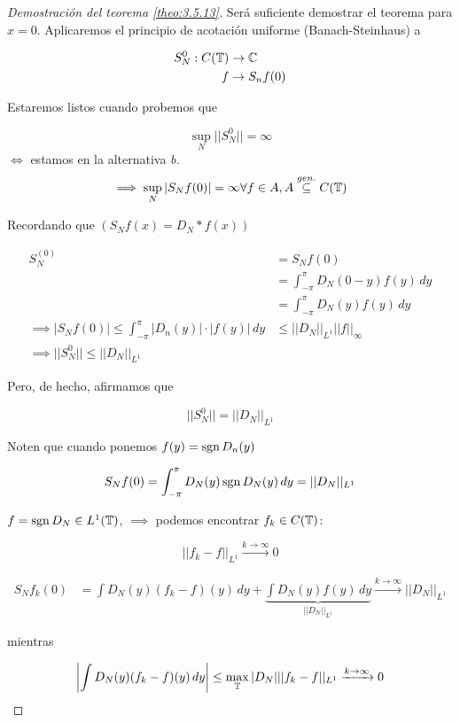 \begin{proof}[Demostración del teorema \ref{theo:3.5.13}]
    Será suficiente demostrar el teorema para $x=0$. Aplicaremos el principio de acotación uniforme (Banach-Steinhaus) a 

    \begin{align*}
        S_N^0:C(\mathbb{T})&\to\mathbb{C}\\
        f&\to S_n f(0)
    \end{align*}

    Estaremos listos cuando probemos que 

    \[\sup_N ||S_N^0||=\infty\]
    $\iff$ estamos en la alternativa \emph{b.}
    \[\implies \sup_N |S_N f(0)|=\infty\forall f\in A, A\overset{gen.}{\subseteq} C(\mathbb{T})\]

    Recordando que $(S_N f(x)=D_N*f(x))$

    \begin{align*}
        S_N^{(0)}&=S_N f(0)\\
        &=\int_{-\pi}^\pi D_N(0-y)f(y)\,dy\\
        &=\int_{-\pi}^\pi D_N(y)f(y)\,dy\\
        \implies |S_N f(0)|\leq \int_{-\pi}^\pi |D_n(y)|\cdot|f(y)|\,dy&\leq ||D_N||_{L^1}||f||_{\infty}\\
        \implies ||S_N^0||\leq ||D_N||_{L^1}
    \end{align*}

    Pero, de hecho, afirmamos que 

    \[||S_N^0||=||D_N||_{L^1}\]

    Noten que cuando ponemos $f(y)=\operatorname{sgn} D_n(y)$

    \[S_N f(0)=\int_{-\pi}^\pi D_N(y)\operatorname{sgn} D_N(y)\,dy=||D_N||_{L^1}\]

    $f=\operatorname{sgn} D_N\in L^1(\mathbb{T})$, $\implies$ podemos encontrar $f_k\in C(\mathbb{T})$:

    \[||f_k-f||_{L^1}\xrightarrow{k\to\infty}0\]

    \begin{align*}
        S_N f_k(0)&=\int D_N(y)(f_k-f)(y)\,dy+\underbrace{\int D_N(y)f(y)\,dy}_{||D_N||_{L^1}}\xrightarrow{k\to\infty} ||D_N||_{L^1}
    \end{align*}

    mientras 

    \[\left|\int D_N(y)(f_k-f)(y)\,dy\right|\leq \max_{\mathbb{T}} |D_N|||f_k-f||_{L^1}\xrightarrow{k\to\infty}0\]
\end{proof}